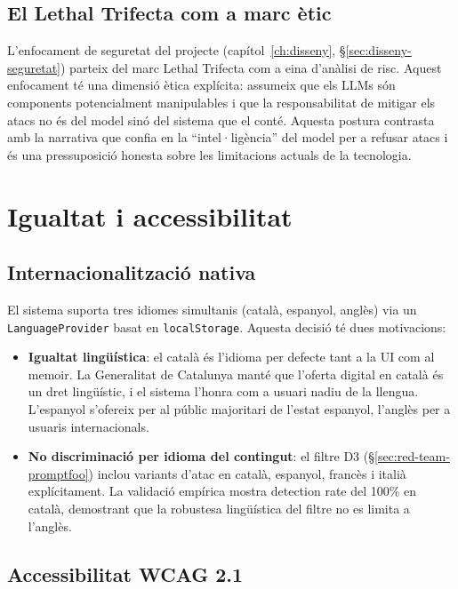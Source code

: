 \subsection{El Lethal Trifecta com a marc ètic}

L'enfocament de seguretat del projecte (capítol~\ref{ch:disseny}, \S\ref{sec:disseny-seguretat}) parteix del marc Lethal Trifecta com a eina d'anàlisi de risc. Aquest enfocament té una dimensió ètica explícita: assumeix que els LLMs són components potencialment manipulables i que la responsabilitat de mitigar els atacs no és del model sinó del sistema que el conté. Aquesta postura contrasta amb la narrativa que confia en la ``intel·ligència'' del model per a refusar atacs i és una pressuposició honesta sobre les limitacions actuals de la tecnologia.

\section{Igualtat i accessibilitat}
\label{sec:igualtat-accessibilitat}

\subsection{Internacionalització nativa}

El sistema suporta tres idiomes simultanis (català, espanyol, anglès) via un \texttt{LanguageProvider} basat en \texttt{localStorage}. Aquesta decisió té dues motivacions:

\begin{itemize}
    \item \textbf{Igualtat lingüística}: el català és l'idioma per defecte tant a la UI com al memoir. La Generalitat de Catalunya manté que l'oferta digital en català és un dret lingüístic, i el sistema l'honra com a usuari nadiu de la llengua. L'espanyol s'ofereix per al públic majoritari de l'estat espanyol, l'anglès per a usuaris internacionals.
    \item \textbf{No discriminació per idioma del contingut}: el filtre D3 (\S\ref{sec:red-team-promptfoo}) inclou variants d'atac en català, espanyol, francès i italià explícitament. La validació empírica mostra detection rate del 100\% en català, demostrant que la robustesa lingüística del filtre no es limita a l'anglès.
\end{itemize}

\subsection{Accessibilitat WCAG 2.1}

